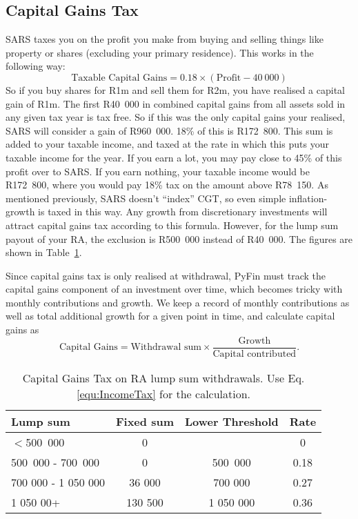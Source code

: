 \documentclass[a4paper, justified]{tufte-handout}
\begin{document}
\subsection{Capital Gains Tax}
SARS taxes you on the profit you make from buying and selling things like property or shares (excluding your primary residence).
This works in the following way:
\begin{equation} \label{eq:CGT}
\textrm{Taxable Capital Gains} = 0.18\times(\textrm{Profit} - 40~000)
\end{equation}
So if you buy shares for R1m and sell them for R2m, you have realised a capital gain of R1m. The first R40~000 in combined capital gains from all assets sold in any given tax year is tax free. So if this was the only capital gains your realised, SARS will consider a gain of R960~000. 18\% of this is R172~800. This sum is added to your taxable income, and taxed at the rate in which this puts your taxable income for the year. If you earn a lot, you may pay close to 45\% of this profit over to SARS. If you earn nothing, your taxable income would be R172~800, where you would pay 18\% tax on the amount above R78~150. As mentioned previously, SARS doesn't ``index'' CGT, so even simple inflation-growth is taxed in this way. Any growth from discretionary investments will attract capital gains tax according to this formula. However, for the lump sum payout of your RA, the exclusion is R500~000 instead of R40~000. The figures are shown in Table~\ref{tab:CGTRA}.

Since capital gains tax is only realised at withdrawal, PyFin must track the capital gains component of an investment over time, which becomes tricky with monthly contributions and growth. We keep a record of monthly contributions as well as total additional growth for a given point in time, and calculate capital gains as
\begin{equation}
\textrm{Capital Gains} = \textrm{Withdrawal sum}\times\frac{\textrm{Growth}}{\textrm{Capital contributed}}.
\end{equation}

\begin{table}[]
	\centering
	\caption{Capital Gains Tax on RA lump sum withdrawals. Use Eq.\ref{equ:IncomeTax} for the calculation.}
	\label{tab:CGTRA}
	\begin{tabular}{lccc}
		\toprule
		\textbf{Lump sum}  & \textbf{Fixed sum} & \textbf{Lower Threshold} & \textbf{Rate} \\
		\midrule
		$<$500~000            & 0         &          & 0 \\
		500~000 - 700~000  & 0    & 500~000         & 0.18 \\
		700 000 - 1 050 000  & 36 000   & 700 000          & 0.27  \\
		1 050 00+  & 130 500   & 1 050 000      & 0.36  \\
		\bottomrule
	\end{tabular}
\end{table}
\end{document}
